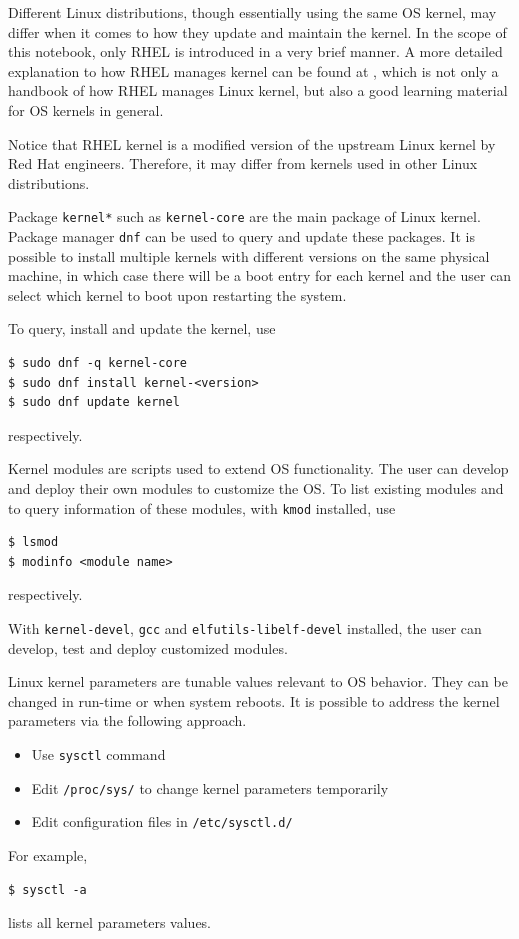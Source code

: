 Different Linux distributions, though essentially using the same OS kernel, may differ when it comes to how they update and maintain the kernel. In the scope of this notebook, only RHEL is introduced in a very brief manner. A more detailed explanation to how RHEL manages kernel can be found at \cite{redhat2022kernel}, which is not only a handbook of how RHEL manages Linux kernel, but also a good learning material for OS kernels in general.

Notice that RHEL kernel is a modified version of the upstream Linux kernel by Red Hat engineers. Therefore, it may differ from kernels used in other Linux distributions.

Package \verb|kernel*| such as \verb|kernel-core| are the main package of Linux kernel. Package manager \verb|dnf| can be used to query and update these packages. It is possible to install multiple kernels with different versions on the same physical machine, in which case there will be a boot entry for each kernel and the user can select which kernel to boot upon restarting the system.

To query, install and update the kernel, use
\begin{lstlisting}
$ sudo dnf -q kernel-core
$ sudo dnf install kernel-<version>
$ sudo dnf update kernel
\end{lstlisting}
respectively.

Kernel modules are scripts used to extend OS functionality. The user can develop and deploy their own modules to customize the OS. To list existing modules and to query information of these modules, with \verb|kmod| installed, use
\begin{lstlisting}
$ lsmod
$ modinfo <module name>
\end{lstlisting}
respectively.

With \verb|kernel-devel|, \verb|gcc| and \verb|elfutils-libelf-devel| installed, the user can develop, test and deploy customized modules.

Linux kernel parameters are tunable values relevant to OS behavior. They can be changed in run-time or when system reboots. It is possible to address the kernel parameters via the following approach.
\begin{itemize}
	\item Use \verb|sysctl| command
	\item Edit \verb|/proc/sys/| to change kernel parameters temporarily
	\item Edit configuration files in \verb|/etc/sysctl.d/|
\end{itemize}
For example,
\begin{lstlisting}
$ sysctl -a
\end{lstlisting}
lists all kernel parameters values.








